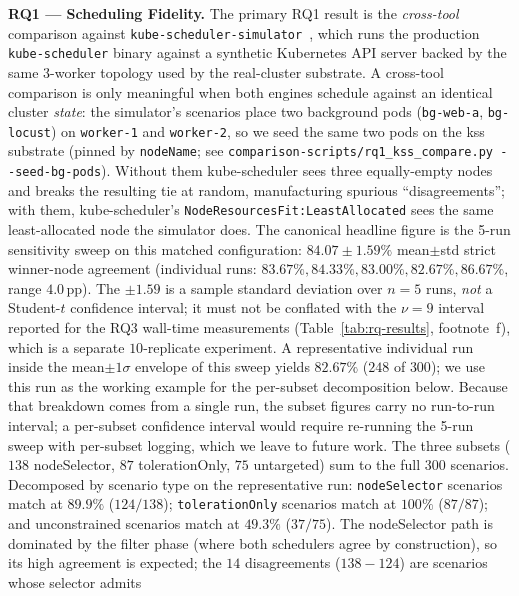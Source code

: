 \documentclass[ASNA,twocolumn]{USG}
\begin{document}
    \textbf{RQ1 --- Scheduling Fidelity.}
    The primary RQ1 result is the \emph{cross-tool} comparison against
    \texttt{kube-scheduler-simulator}~\cite{KubeSchSim2025}, which runs
    the production \texttt{kube-scheduler} binary against a synthetic
    Kubernetes API server backed by the same 3-worker topology used by
    the real-cluster substrate. A cross-tool comparison is only
    meaningful when both engines schedule against an identical cluster
    \emph{state}: the simulator's scenarios place two background pods
    (\texttt{bg-web-a}, \texttt{bg-locust}) on \texttt{worker-1} and
    \texttt{worker-2}, so we seed the same two pods on the kss substrate
    (pinned by \texttt{nodeName}; see
    \texttt{comparison-scripts/rq1\_kss\_compare.py~-{}-seed-bg-pods}).
    Without them kube-scheduler sees three equally-empty nodes and breaks
    the resulting tie at random, manufacturing spurious ``disagreements'';
    with them, kube-scheduler's \texttt{NodeResourcesFit:LeastAllocated}
    sees the same least-allocated node the simulator does.
    The canonical headline figure is the
    5-run sensitivity sweep on this matched configuration:
    $84.07\pm1.59\%$ mean$\pm$std strict winner-node agreement
    (individual runs: $83.67\%, 84.33\%, 83.00\%, 82.67\%, 86.67\%$,
    range $4.0\,$pp). The $\pm1.59$ is a sample standard deviation over
    $n=5$ runs, \emph{not} a Student-$t$ confidence interval; it must not
    be conflated with the $\nu=9$ interval reported for the RQ3 wall-time
    measurements (Table~\ref{tab:rq-results}, footnote~f), which is a
    separate $10$-replicate experiment. A representative individual run
    inside the mean$\pm 1\sigma$ envelope of this sweep yields $82.67\%$
    ($248$ of $300$); we use this run as the working example for the
    per-subset decomposition below. Because that breakdown comes from a
    single run, the subset figures carry no run-to-run interval; a
    per-subset confidence interval would require re-running the 5-run
    sweep with per-subset logging, which we leave to future work. The
    three subsets ($138$ nodeSelector, $87$ tolerationOnly, $75$
    untargeted) sum to the full $300$ scenarios.
    Decomposed by scenario type on the representative run:
    \texttt{nodeSelector} scenarios match at $89.9\%$ ($124/138$);
    \texttt{tolerationOnly} scenarios match at $100\%$ ($87/87$); and
    unconstrained scenarios match at $49.3\%$ ($37/75$). The
    nodeSelector path is dominated by the filter phase (where both
    schedulers agree by construction), so its high agreement is expected;
    the $14$ disagreements ($138-124$) are scenarios whose selector admits
\end{document}

